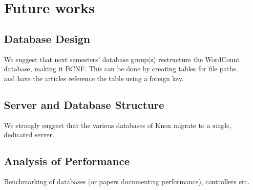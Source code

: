 \section{Future works}
\subsection{Database Design}
We suggest that next semesters' database group(s) restructure the WordCount database, making it BCNF. 
This can be done by creating tables for file paths, and have the articles reference the table using a foreign key.
\subsection{Server and Database Structure}
We strongly suggest that the various databases of Knox migrate to a single, dedicated server.

\subsection{Analysis of Performance}
Benchmarking of databases (or papers documenting performance), controllers etc. 